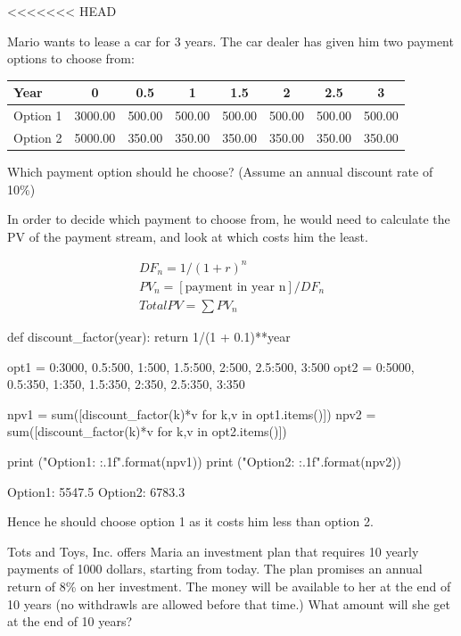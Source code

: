 <<<<<<< HEAD
\cprotEnv\begin{question}
Mario wants to lease a car for 3 years. The car dealer has given him two payment options to choose from:

\begin{table}[htbp]
\centering
\begin{tabular}{l|c|c|c|c|c|c|c}
Year & 0 & 0.5 & 1 & 1.5 & 2 & 2.5 & 3 \\
\hline
Option 1 &	3000.00	& 500.00 & 500.00 &	500.00 & 500.00 & 500.00 & 500.00 \\
\hline
Option 2 &	5000.00	& 350.00 & 350.00 &	350.00 & 350.00 & 350.00 & 350.00 \\
\end{tabular}
\end{table}

Which payment option should he choose? (Assume an annual discount rate of 10\%)
\end{question}

\cprotEnv\begin{solution}
In order to decide which payment to choose from, he would need to calculate the PV of the payment stream, and look at which costs him the least. 

\begin{gather*}
DF_n = 1/(1 + r)^n \\
PV_n = [\textrm{payment in year n}] / DF_n \\
Total PV = \sum PV_n
\end{gather*}

\begin{ipython}
def discount_factor(year):
    return 1/(1 + 0.1)**year

opt1 = {0:3000, 0.5:500, 1:500, 1.5:500, 2:500, 2.5:500, 3:500}
opt2 = {0:5000, 0.5:350, 1:350, 1.5:350, 2:350, 2.5:350, 3:350}

npv1 = sum([discount_factor(k)*v for k,v in opt1.items()])
npv2 = sum([discount_factor(k)*v for k,v in opt2.items()])

print ("Option1: {:.1f}".format(npv1))
print ("Option2: {:.1f}".format(npv2))
\end{ipython}
\begin{ioutput}
Option1: 5547.5
Option2: 6783.3
\end{ioutput}
Hence he should choose option 1 as it costs him less than option 2.
\end{solution}

\begin{question}
Tots and Toys, Inc. offers Maria an investment plan that requires 10 yearly payments of 1000 dollars, starting from today. The plan promises an annual return of 8\% on her investment. The money will be available to her at the end of 10 years (no withdrawls are allowed before that time.) 
What amount will she get at the end of 10 years?
\end{question}

